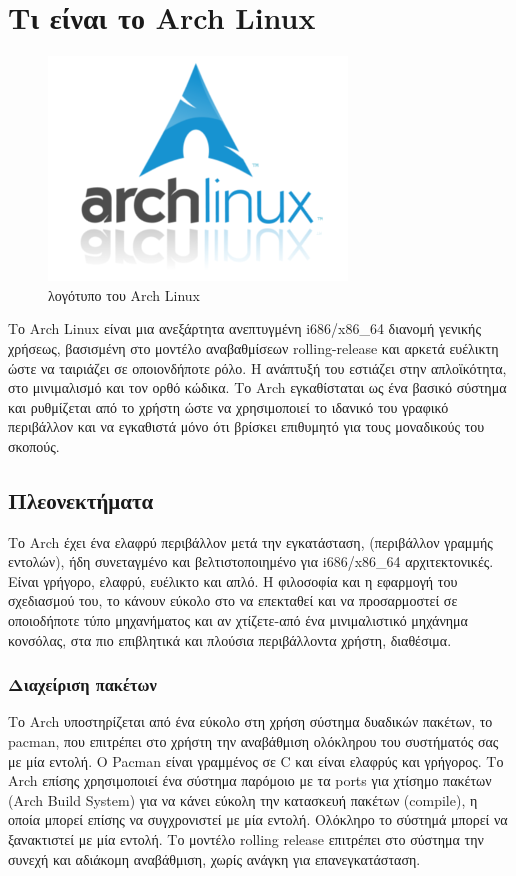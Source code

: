 \documentclass[a4paper,titlepage,oneside,12pt]{article}
\begin{document}
\tableofcontents %
\newpage
\section{Τι είναι το Arch Linux}

\begin{figure}[hbp!]
\centering
\includegraphics[scale=1]{archlinux.png}
\caption{λογότυπο του Arch Linux}
\end{figure}

Το Arch Linux\cite{archlinux} είναι μια ανεξάρτητα ανεπτυγμένη i686/x86\_64 διανομή γενικής χρήσεως, βασισμένη στο μοντέλο αναβαθμίσεων rolling-release\cite{rolling} και αρκετά ευέλικτη ώστε να ταιριάζει σε οποιονδήποτε ρόλο. Η ανάπτυξή του εστιάζει στην απλοϊκότητα, στο μινιμαλισμό και τον ορθό κώδικα. Το Arch εγκαθίσταται ως ένα βασικό σύστημα και ρυθμίζεται από το χρήστη ώστε να χρησιμοποιεί το ιδανικό του γραφικό περιβάλλον και να εγκαθιστά μόνο ότι βρίσκει επιθυμητό για τους μοναδικούς του σκοπούς. 
\pagebreak

\subsection{Πλεονεκτήματα}
Το Arch έχει ένα ελαφρύ περιβάλλον μετά την εγκατάσταση, (περιβάλλον γραμμής εντολών), ήδη συνεταγμένο και βελτιστοποιημένο για i686/x86\_64 αρχιτεκτονικές. Είναι γρήγορο, ελαφρύ, ευέλικτο και απλό. Η φιλοσοφία και η εφαρμογή του σχεδιασμού του, το κάνουν εύκολο στο να επεκταθεί και να προσαρμοστεί σε οποιοδήποτε τύπο μηχανήματος και αν χτίζετε-από ένα μινιμαλιστικό μηχάνημα κονσόλας, στα πιο επιβλητικά και πλούσια περιβάλλοντα χρήστη, διαθέσιμα. 

\subsubsection{Διαχείριση πακέτων}
Το Arch υποστηρίζεται από ένα εύκολο στη χρήση σύστημα δυαδικών πακέτων, το pacman, που επιτρέπει στο χρήστη την αναβάθμιση ολόκληρου του συστήματός σας με μία εντολή. Ο Pacman είναι γραμμένος σε C και είναι ελαφρύς και γρήγορος. Το Arch επίσης χρησιμοποιεί ένα σύστημα παρόμοιο με τα ports για χτίσημο πακέτων (Arch Build System) για να κάνει εύκολη την κατασκευή πακέτων (compile), η οποία μπορεί επίσης να συγχρονιστεί με μία εντολή. Ολόκληρο το σύστημά μπορεί να ξανακτιστεί με μία εντολή. Το μοντέλο rolling release επιτρέπει στο σύστημα την συνεχή και αδιάκομη αναβάθμιση, χωρίς ανάγκη για επανεγκατάσταση.
\end{document}
